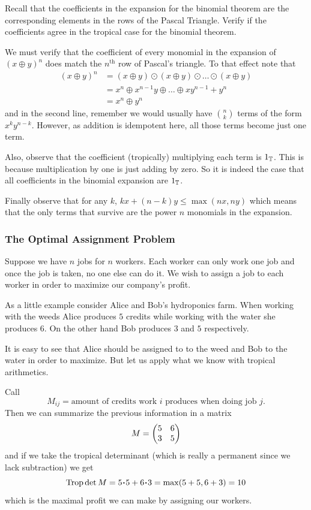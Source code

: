 \documentclass[12pt]{memoir}
\DeclareMathOperator{\Trop}{Trop}
\theoremstyle{definition}
\begin{document}
\begin{Ej}[2]
Recall that the coefficients in the expansion for the binomial theorem are the corresponding elements in the rows of the Pascal Triangle. Verify if the coefficients agree in the tropical case for the binomial theorem.
\end{Ej}

\begin{ptcb}
We must verify that the coefficient of every monomial in the expansion of $(x\oplus y)^n$ does match the $n^{\text{th}}$ row of Pascal's triangle. To that effect note that 
\begin{align*}
    (x\oplus y)^n&=(x\oplus y)\odot(x\oplus y)\odot\dots\odot(x\oplus y)\\
    &=x^n\oplus x^{n-1}y\oplus\dots\oplus xy^{n-1}+y^n\\
    &=x^n\oplus y^n
\end{align*}
and in the second line, remember we would usually have $\binom{n}{k}$ terms of the form $x^ky^{n-k}$. However, as addition is idempotent here, all those terms become just one term.\par 
Also, observe that the coefficient (tropically) multiplying each term is $1_{\mathbb{T}}$. This is because multiplication by one is just adding by zero. So it is indeed the case that all coefficients in the binomial expansion are $1_{\mathbb{T}}$.\par 
Finally observe that for any $k$, $kx+(n-k)y\leq\max(nx,ny)$ which means that the only terms that survive are the power $n$ monomials in the expansion. 
\end{ptcb}


\subsubsection{The Optimal Assignment Problem}

Suppose we have $n$ jobs for $n$ workers. Each worker can only work one job and once the job is taken, no one else can do it. We wish to assign a job to each worker in order to maximize our company's profit.

\begin{Ex}
    As a little example consider Alice and Bob's hydroponics farm. When working with the weeds Alice produces $5$ credits while working with the water she produces $6$. On the other hand Bob produces $3$ and $5$ respectively.\par 
    It is easy to see that Alice should be assigned to to the weed and Bob to the water in order to maximize. But let us apply what we know with tropical arithmetics.\par 
    Call 
    $$M_{ij}=\text{amount of credits work }i\text{ produces when doing job }j.$$
    Then we can summarize the previous information in a matrix 
    $$M=\begin{pmatrix} 5 & 6 \\ 3 & 5 \end{pmatrix}$$
    and if we take the tropical determinant (which is really a permanent since we lack subtraction) we get
    $$\Trop\det M=5\.5+6\.3=\max(5+5,6+3)=10$$
    which is the maximal profit we can make by assigning our workers.
\end{Ex}
\end{document}
